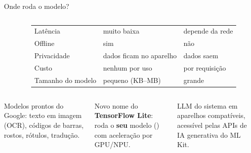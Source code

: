 \documentclass[aspectratio=169,10pt]{beamer}
\begin{document}
\begin{frame}{Onde roda o modelo?}
  \begin{columns}[c]
    \begin{column}{0.54\textwidth}
      \centering
    \end{column}
    \begin{column}{0.44\textwidth}
      \scriptsize
      \begin{tabularx}{\linewidth}{@{}l L L@{}}
        \toprule
        &  &  \\
        \midrule
        Latência & muito baixa & depende da rede \\
        Offline & sim & não \\
        Privacidade & dados ficam no aparelho & dados saem \\
        Custo & nenhum por uso & por requisição \\
        Tamanho do modelo & pequeno (KB--MB) & grande \\
        \bottomrule
      \end{tabularx}
    \end{column}
  \end{columns}
  \vspace{4pt}
  \begin{columns}[T]
    \begin{column}{0.32\textwidth}
      \begin{conceito}[ML Kit]
        Modelos prontos do Google: texto em imagem (OCR), códigos de barras, rostos, rótulos, tradução.
      \end{conceito}
    \end{column}
    \begin{column}{0.32\textwidth}
      \begin{conceito}[LiteRT]
        Novo nome do \textbf{TensorFlow Lite}: roda o \textbf{seu} modelo () com aceleração por GPU/NPU.
      \end{conceito}
    \end{column}
    \begin{column}{0.32\textwidth}
      \begin{conceito}
        LLM do sistema em aparelhos compatíveis, acessível pelas APIs de IA generativa do ML Kit.
      \end{conceito}
    \end{column}
  \end{columns}
\end{frame}
\end{document}
